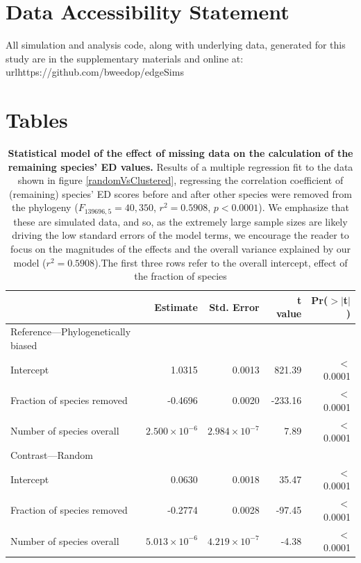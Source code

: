 \documentclass[10pt,english]{article}
\begin{document}
\section*{Data Accessibility Statement}
All simulation and analysis code, along with underlying data, generated for this
study are in the supplementary materials and online at:
url{https://github.com/bweedop/edgeSims}

\section*{Tables}

\begin{table}[ht]
  \centering
  \begin{tabular}{lrrrr}
    \hline
    & Estimate & Std. Error & t value & Pr($>$$|$t$|$) \\ \hline
    Reference---Phylogenetically biased\\
    Intercept & 1.0315 & 0.0013 & 821.39 & $<$0.0001 \\
    Fraction of species removed & -0.4696 & 0.0020 & -233.16 & $<$0.0001 \\
    Number of species overall & $2.500 \times 10^{-6}$ & $2.984 \times 10^{-7}$ & 7.89 & $<$0.0001 \\
    Contrast---Random\\
    Intercept & 0.0630 & 0.0018 & 35.47 & $<$0.0001 \\
    Fraction of species removed & -0.2774 & 0.0028 & -97.45 & $<$0.0001 \\
    Number of species overall & $5.013 \times 10^{-6}$ & $4.219 \times 10^{-7}$ & -4.38 & $<$0.0001 \\ \hline
  \end{tabular}
  \caption{\textbf{Statistical model of the effect of missing data on the
      calculation of the remaining species' ED values.} Results of a multiple
      regression fit to the data shown in figure \ref{randomVsClustered},
      regressing the correlation coefficient of (remaining) species' ED scores
      before and after other species were removed from the phylogeny
      ($F_{139696,5} = 40,350$, $r^{2} = 0.5908$, $p < 0.0001$). We emphasize
      that these are simulated data, and so, as the extremely large sample sizes
      are likely driving the low standard errors of the model terms, we
      encourage the reader to focus on the magnitudes of the effects and the
      overall variance explained by our model ($r^{2} = 0.5908$).The first three
      rows refer to the overall intercept, effect of the fraction of species
}
\end{table}
\end{document}

